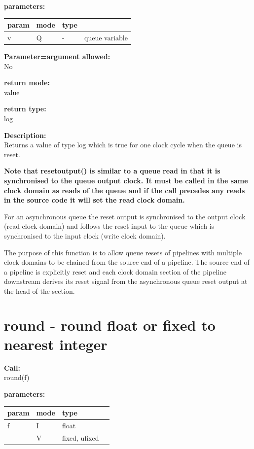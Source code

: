         {\bf parameters:} \\
        \begin{tabular}{| l | l | l | l |}
        \hline
        param  & mode & type & \\
        \hline \hline
        v & Q & - & queue variable \\ \hline
        \end{tabular}
        
        {\bf Parameter=argument allowed:} \\
        No
        
        {\bf return mode:} \\
        value

        {\bf return type:} \\
        log
        
        {\bf Description:} \\
        Returns a value of type log which is true for one clock cycle when the
        queue is reset.

        {\bf Note that resetoutput() is similar to a queue read in that it is
        synchronised to the queue output clock. It must be called in the same
        clock domain as reads of the queue and if the call precedes any reads in
        the source code it will set the read clock domain.}

        For an asynchronous queue the reset output is synchronised to the output
        clock (read clock domain) and follows the reset input to the queue
        which is synchronised to the input clock (write clock domain).
        
        The purpose of this function is to allow queue resets of pipelines with
        multiple clock domains to be chained from the source end of a pipeline.
        The source end of a pipeline is explicitly reset and each clock domain
        section of the pipeline downstream derives its reset signal from the
        asynchronous queue reset output at the head of the section.
 


    \section{round - round float or fixed to nearest integer}\label{sec:ifround}
        
        
        {\bf Call:} \\
        round(f)
        
        {\bf parameters:} \\
        \begin{tabular}{| l | l | l | l |}
        \hline
        param  & mode & type & \\
        \hline \hline
        f & I & float & \\ \hline
          & V & fixed, ufixed & \\ \hline
        \end{tabular}
        
